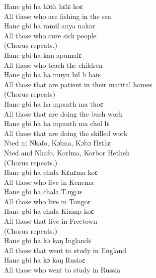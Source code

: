 Hane gbi ha hɔth hɛlɛ koɛ\\
All those who are fishing in the sea\\

Hane gbi ha ramil anya nakaɛ\\
All those who cure sick people\\

(Chorus repeats.)\\

Hane gbi ha kaŋ apumalɛ\\
All those who teach the children\\

Hane gbi ha ha muyu bil li haiɛ\\
All those that are patient in their marital homes\\

(Chorus repeats)\\

Hane gbi ha ha mpanth ma thoɛ\\
All those that are doing the bush work\\

Hane gbi ha ha mpanth ma chol lɛ\\
All those that are doing the skilled work\\

Nted ni Nkafo, Kɔlma, Kɔbɔ Hɛthɛ\\
Nted and Nkafo, Korlma, Korbor Hetheh\\

(Chorus repeats.)\\

Hane gbi ha chala Kɛnɛma koɛ\\
All those who live in Kenema\\

Hane gbi ha chala Tɔŋgɔɛ\\
All those who live in Tongor\\

Hane gbi ha chala Kiamp koɛ\\
All those that live in Freetown\\

(Chorus repeats.)\\

Hane gbi ha kɔ kaŋ Inglandɛ\\
All those that went to study in England\\

Hane gbi ha kɔ kaŋ Rusiaɛ\\
All those who went to study in Russia\\

